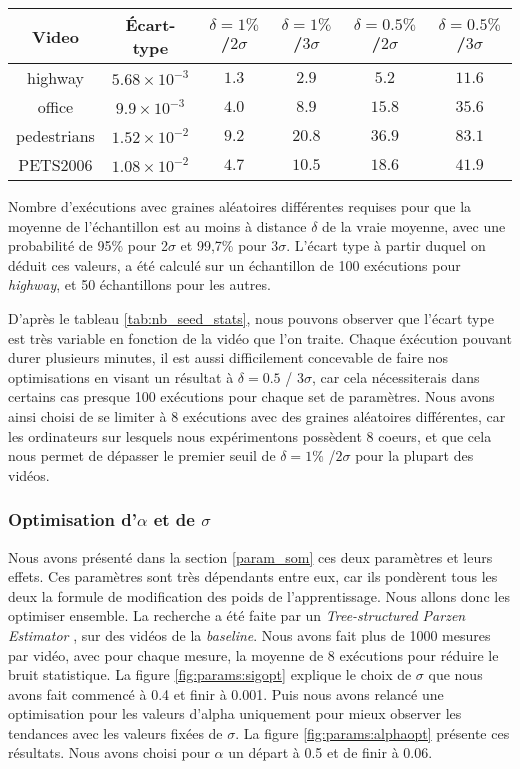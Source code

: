 	\begin{tableth}
	\label{tab:nb_seed_stats}
	\begin{tabular}{|c|c|cccc|}
		\hline
		Video	& Écart-type & $\delta=1\%$ /$2\sigma$ & $\delta=1\%$ /$3\sigma$ & $\delta=0.5\%$ /$2\sigma$ & $\delta=0.5\%$ /$3\sigma$\\
		\hline
		highway & $5.68 \times 10^{-3}$ & $1.3$ & $2.9$ & $5.2$ & $11.6$\\
		office & $9.9 \times 10^{-3}$ & $4.0$ & $8.9$ & $15.8$ & $35.6$\\
		pedestrians & $1.52 \times 10^{-2}$ & $9.2$ & $20.8$ & $36.9$ & $83.1$\\
		PETS2006 & $1.08 \times 10^{-2}$ & $4.7$ & $10.5$ & $18.6$ & $41.9$\\
		\hline
	\end{tabular}
	\caption[Estimations statistiques du nombre de graines requises]{Nombre d'exécutions avec graines aléatoires différentes requises pour que la moyenne de l'échantillon est au moins à distance $\delta$ de la vraie moyenne, avec une probabilité de 95\% pour 2$\sigma$ et 99,7\% pour 3$\sigma$. L'écart type à partir duquel on déduit ces valeurs, a été calculé sur un échantillon de 100 exécutions pour \textit{highway}, et 50 échantillons pour les autres.}
	\end{tableth}

	D'après le tableau \ref{tab:nb_seed_stats}, nous pouvons observer que l'écart type est très variable en fonction de la vidéo que l'on traite. Chaque éxécution pouvant durer plusieurs minutes, il est aussi difficilement concevable de faire nos optimisations en visant un résultat à $\delta = 0.5$ / $3\sigma$, car cela nécessiterais dans certains cas presque 100 exécutions pour chaque set de paramètres. Nous avons ainsi choisi de se limiter à 8 exécutions avec des graines aléatoires différentes, car les ordinateurs sur lesquels nous expérimentons possèdent 8 coeurs, et que cela nous permet de dépasser le premier seuil de $\delta=1\%$ /$2\sigma$ pour la plupart des vidéos.

	\subsubsection{Optimisation d'$\alpha$ et de $\sigma$}

	Nous avons présenté dans la section \ref{param_som} ces deux paramètres et leurs effets. Ces paramètres sont très dépendants entre eux, car ils pondèrent tous les deux la formule de modification des poids de l'apprentissage. Nous allons donc les optimiser ensemble. La recherche a été faite par un \textit{Tree-structured Parzen Estimator} \cite{bergstra2011algorithms}, sur des vidéos de la \textit{baseline}. Nous avons fait plus de 1000 mesures par vidéo, avec pour chaque mesure, la moyenne de 8 exécutions pour réduire le bruit statistique. La figure \ref{fig:params:sigopt} explique le choix de $\sigma$ que nous avons fait commencé à 0.4 et finir à 0.001. Puis nous avons relancé une optimisation pour les valeurs d'alpha uniquement pour mieux observer les tendances avec les valeurs fixées de $\sigma$. La figure \ref{fig:params:alphaopt} présente ces résultats. Nous avons choisi pour $\alpha$ un départ à 0.5 et de finir à 0.06.

